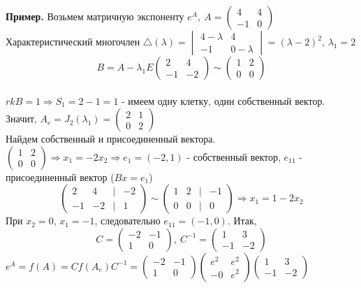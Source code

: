 \textbf{Пример.} Возьмем матричную экспоненту $e^A,~A=\begin{pmatrix}4&4\\-1&0
\end{pmatrix}$\\
Характеристический многочлен $\triangle(\lambda)=\begin{vmatrix}4-\lambda&4\\-
1&0-\lambda\end{vmatrix}=(\lambda-2)^2$, $\lambda_1=2$\\
$$B=A-\lambda_1E\begin{pmatrix}2&4\\-1&-2\end{pmatrix}\sim\begin{pmatrix}1&2\\
0&0\end{pmatrix}$$\\
$rkB=1\Rightarrow S_1=2-1=1$ - имеем одну клетку, один собственный вектор. 
Значит, $A_e=J_2(\lambda_1)=\begin{pmatrix}2&1\\0&2\end{pmatrix}$\\
Найдем собственный и присоединенный вектора. $\begin{pmatrix}1&2\\0&0\end{pmatrix}
\Rightarrow x_1=-2x_2\Rightarrow e_1=(-2,1)$ - собственный вектор, $e_{11}$ -
присоединенный вектор ($Bx=e_1$)\\
$$\begin{pmatrix}2&4&|&-2\\-1&-2&|&1\end{pmatrix}\sim\begin{pmatrix}1&2&|
				  &-1\\0&0&|&0\end{pmatrix}\Rightarrow x_1=1-2x_2$$
При $x_2=0$, $x_1=-1$, следовательно $e_{11}=(-1,0)$. Итак, 
$$C=\begin{pmatrix}-2&-1\\1&0\end{pmatrix},~C^{-1}=\begin{pmatrix}1&3\\-1&-2
\end{pmatrix}$$
$e^A=f(A)=Cf(A_e)C^{-1}=\begin{pmatrix}-2&-1\\1&0\end{pmatrix}\begin{pmatrix}
e^2&e^2\\-0&e^2\end{pmatrix}\begin{pmatrix}1&3\\-1&-2\end{pmatrix}$
